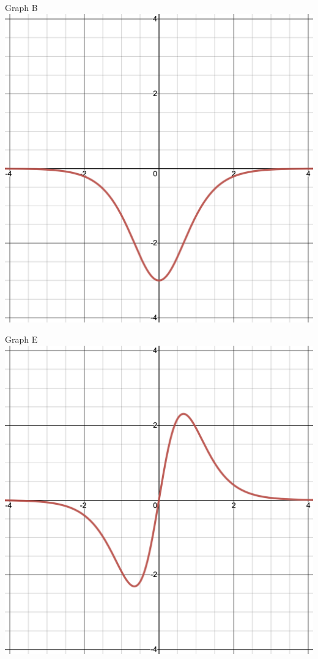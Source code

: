 \documentclass{siproblemset}
\begin{document}
\begin{multipartquestion}
\begin{multicols}{3}
\begin{center}
            \end{center}
            \begin{center}
                Graph B
                \includegraphics[width=\linewidth]{img/pt2-graph3e}
            \end{center}
            \begin{center}
                Graph E
                \includegraphics[width=\linewidth]{img/pt2-graph3f}

\end{center}
\end{multicols}
\end{multipartquestion}
\end{document}
